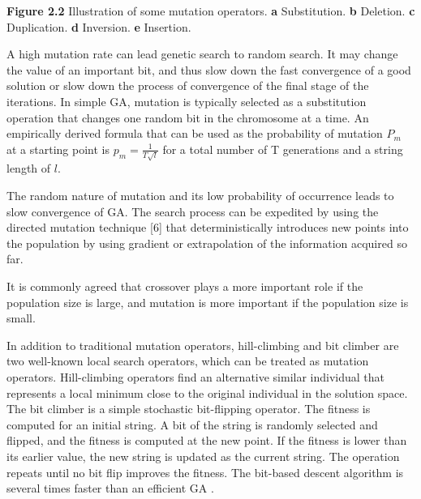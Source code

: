 \documentclass[14pt]{article}
\numberwithin{equation}{subsection}
\begin{document}
		\noindent \textbf{Figure 2.2} Illustration of some mutation operators. \textbf{a} Substitution. 
		\textbf{b} Deletion. \textbf{c} Duplication. \textbf{d} Inversion. \textbf{e} Insertion. \vspace{7mm}
		
		A high mutation rate can lead genetic search to random search. It may change the value of an important bit, and
		thus slow down the fast convergence of a good solution or slow down the process of convergence of the final
		stage of the iterations. In simple GA, mutation is typically selected as a substitution operation that changes
		one random bit in the chromosome at a time. An empirically derived formula that can be used as the probability
		of mutation $P_m$ at a starting point is $p_m = \frac{1}{T \sqrt{l}}$ for a total number of T generations and a
		string length of $l$. \par
		The random nature of mutation and its low probability of occurrence leads to slow convergence of GA. The search
		process can be expedited by using the directed mutation technique [6] that deterministically introduces new
		points into the population by using gradient or extrapolation of the information acquired so far. \par
		It is commonly agreed that crossover plays a more important role if the population size is large, and mutation
		is more important if the population size is small. \par
		In addition to traditional mutation operators, hill-climbing and bit climber are two well-known local search
		operators, which can be treated as mutation operators. Hill-climbing operators find an alternative similar
		individual that represents a local minimum close to the original individual in the solution space. The bit
		climber is a simple stochastic bit-flipping operator. The  fitness is computed for an initial string. A bit of
		the string is randomly selected and flipped, and the fitness is computed at the new point. If the fitness is
		lower	than its earlier value, the new string is updated	as the current string. The operation repeats until no
		bit flip improves the fitness. The bit-based descent algorithm is several times faster than an efficient GA .
		
\end{document}
